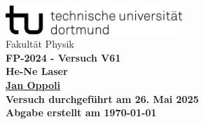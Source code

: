 \begin{titlepage}
    \centering
    \vspace*{1cm}
    \includegraphics[width=0.5\textwidth]{Ressourcen/tud_logo_schwarz(RGB)}\\
    \vspace*{0.25cm}
    \large\textmd{Fakultät Physik} \\
    \vspace*{6cm}
    \huge \bfseries FP-2024 - Versuch V61\\
    \vspace*{0.25cm}
    \large He-Ne Laser\\
    \vspace*{0.25cm}
    \large\textmd{\href{mailto:jan.oppoli@tu-dortmund.de}{Jan Oppoli}} \\
    \vfill
    \small\textmd{Versuch durchgeführt am 26. Mai 2025}\\
    \small\textmd{Abgabe erstellt am \today}
  \end{titlepage}
  \tableofcontents 
  \newpage